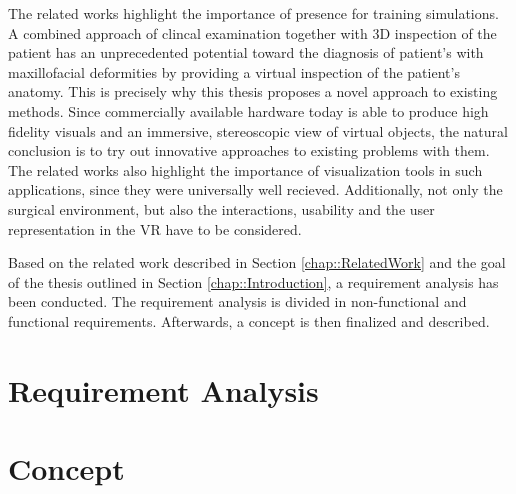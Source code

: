 The related works highlight the importance of presence for training simulations.
A combined approach of clincal examination together with 3D inspection of the patient has an unprecedented potential toward the diagnosis of patient’s with maxillofacial deformities \cite{swennen2009three} by providing a virtual inspection of the patient’s anatomy.
This is precisely why this thesis proposes a novel approach to existing methods.
Since commercially available hardware today is able to produce high fidelity visuals and an immersive, stereoscopic view of virtual objects,
the natural conclusion is to try out innovative approaches to existing problems with them.
The related works also highlight the importance of visualization tools in such applications, since they were universally well recieved. 
Additionally, not only the surgical environment, but also the interactions, usability and the user representation in the VR have to be considered.

Based on the related work described in Section \ref{chap::RelatedWork} and the goal of the thesis outlined in Section \ref{chap::Introduction}, a requirement analysis has been conducted.
The requirement analysis is divided in non-functional and functional requirements.
Afterwards, a concept is then finalized and described.

\section{\label{sec::RequirementAnalysis}Requirement Analysis}

\section{\label{sec::Concept}Concept}

